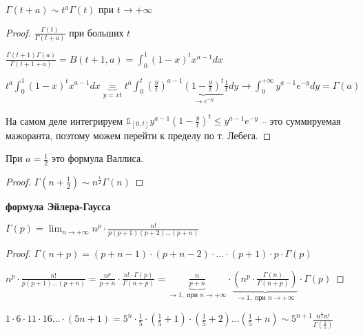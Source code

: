 \begin{theorem}
    $\Gamma(t + a) \sim t^a \Gamma(t)$ при $t \to +\infty$
\end{theorem}

\begin{proof}
    $\frac{\Gamma(t)}{\Gamma(t + a)}$ при больших $t$

    $\frac{\Gamma(t + 1)\Gamma(a)}{\Gamma(t + 1 + a)} = B(t + 1, a) = \int_{0}^{1}(1 - x)^tx^{a - 1}dx$

    $t^a\int_{0}^{1}(1 - x)^tx^{a - 1}dx \underbrace{=}_{y = xt} t^a \int_{0}^{t} {\left(\frac{y}{t}\right)^{a - 1} \underbrace{\left(1 - \frac{y}{t}\right)^t}_{\to e^{-y}} \frac{1}{t} dy} \to \int_{0}^{+\infty}y^{a-1}e^{-y}dy = \Gamma(a)$

    На самом деле интегрируем $\mathds{1}_{[0, t]}y^{a-1}(1 - \frac{y}{t})^t \leq y^{a-1}e^{-y}$ -- это суммируемая мажоранта, поэтому можем перейти к пределу по т. Лебега.
\end{proof}

\begin{consequence}
    При $a = \frac{1}{2}$ это формула Валлиса.
\end{consequence}

\begin{proof}
    $\Gamma(n + \frac{1}{2}) \sim n^{\frac{1}{2}}\Gamma(n)$
\end{proof}

\begin{theorem}\textbf{формула Эйлера-Гаусса}
    
    $\Gamma(p) = \lim_{n \rightarrow +\infty} n^p \cdot \frac{n!}{p(p + 1)(p + 2)\dots (p + n)}$

\end{theorem}

\begin{proof}

    $\Gamma(n + p) = (p + n - 1) \cdot (p + n - 2) \cdot \dots \cdot (p+1) \cdot p \cdot \Gamma(p)$

    $n^p \cdot \frac{n!}{p (p + 1) \dots (p + n)} = \frac{n^p}{p + n} \cdot \frac{n! \cdot \Gamma(p)}{\Gamma(n + p)} = \underbrace{\frac{n}{p + n}}_{\rightarrow 1, \text{ при } n \rightarrow +\infty} \cdot \underbrace{\left(n^p \cdot \frac{\Gamma(n)}{\Gamma(n + p)}\right)}_{\rightarrow 1, \text{ при } n \rightarrow +\infty} \cdot \Gamma(p)$
\end{proof}

\begin{example}
    $1\cdot 6 \cdot 11 \cdot 16 \dots \cdot (5n + 1) = 5^n \cdot \frac{1}{5} \cdot (\frac{1}{5} + 1) \cdot (\frac{1}{5} + 2) \dots (\frac{1}{5} + n) \sim 5^{n+1}\frac{n^{\frac{1}{5}}n!}{\Gamma(\frac{1}{5})}$
\end{example}

